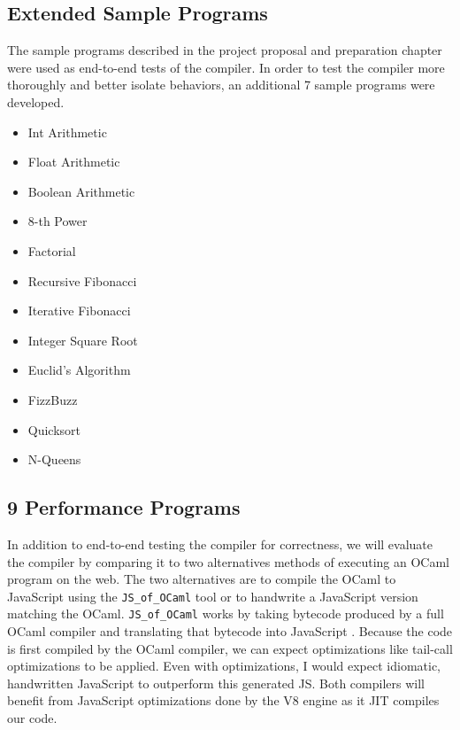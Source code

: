 \documentclass[12pt,a4paper,twoside,openright]{report}
\newcommand{\JSofOCaml}{{\tt JS\_of\_OCaml} }
\begin{document}
\subsection{Extended Sample Programs}
The sample programs described in the project proposal and preparation chapter were used as end-to-end tests of the compiler.
In order to test the compiler more thoroughly and better isolate behaviors, an additional 7 sample programs were developed.
\begin{multicols}{3}
\begin{itemize}
\itemsep-.2em
\item Int Arithmetic
\item Float Arithmetic
\item Boolean Arithmetic
\item 8-th Power
\item Factorial
\item Recursive Fibonacci
\item Iterative Fibonacci
\item Integer Square Root
\item Euclid's Algorithm
\item FizzBuzz
\item Quicksort
\item N-Queens
\end{itemize}
\end{multicols}

\subsection{9 Performance Programs}
In addition to end-to-end testing the compiler for correctness, we will evaluate the compiler by comparing it to two alternatives methods of executing an OCaml program on the web.
The two alternatives are to compile the OCaml to JavaScript using the \JSofOCaml tool or to handwrite a JavaScript version matching the OCaml.
\JSofOCaml works by taking bytecode produced by a full OCaml compiler and translating that bytecode into JavaScript \cite{jsofocaml}.
Because the code is first compiled by the OCaml compiler, we can expect optimizations like tail-call optimizations to be applied.
Even with optimizations, I would expect idiomatic, handwritten JavaScript to outperform this generated JS.
Both compilers will benefit from JavaScript optimizations done by the V8 engine as it JIT compiles our code.
\end{document}
